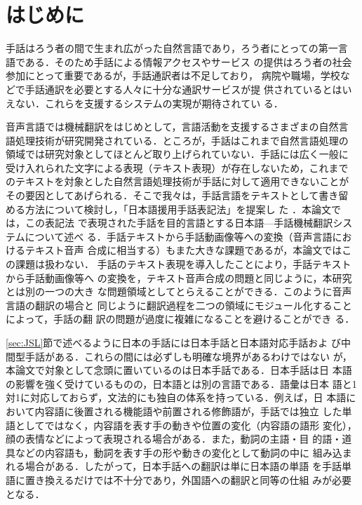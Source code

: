 \documentclass[japanese]{jnlp_1.4}
\begin{document}
\maketitle



\section{はじめに}

手話はろう者の間で生まれ広がった自然言語であり，ろう者にとっての第一言
語である\cite{Yonekawa2002}．そのため手話による情報アクセスやサービス
の提供はろう者の社会参加にとって重要であるが，手話通訳者は不足しており，
病院や職場，学校などで手話通訳を必要とする人々に十分な通訳サービスが提
供されているとはいえない．これらを支援するシステムの実現が期待されてい
る．

音声言語では機械翻訳をはじめとして，言語活動を支援するさまざまの自然言
語処理技術が研究開発されている．ところが，手話はこれまで自然言語処理の
領域では研究対象としてほとんど取り上げられていない．手話には広く一般に
受け入れられた文字による表現（テキスト表現）が存在しないため，これまで
のテキストを対象とした自然言語処理技術が手話に対して適用できないことが
その要因としてあげられる．そこで我々は，手話言語をテキストとして書き留
める方法について検討し，「日本語援用手話表記法」を提案し
た\cite{Matsumoto2006,Matsumoto2005c,Ikeda2006,Matsumoto2004a,Matsumoto2004b,Matsumoto2005a,Matsumoto2005b}
．本論文では，この表記法
で表現された手話を目的言語とする日本語—手話機械翻訳システムについて述べ
る．手話テキストから手話動画像等への変換（音声言語におけるテキスト音声
合成に相当する）もまた大きな課題であるが，本論文ではこの課題は扱わない．
手話のテキスト表現を導入したことにより，手話テキストから手話動画像等へ
の変換を，テキスト音声合成の問題と同じように，本研究とは別の一つの大き
な問題領域としてとらえることができる．このように音声言語の翻訳の場合と
同じように翻訳過程を二つの領域にモジュール化することによって，手話の翻
訳の問題が過度に複雑になることを避けることができ
る．
\nocite{Matsumoto2005a,Matsumoto2005b,Matsumoto2004a,Matsumoto2004b}

\ref{sec:JSL}節で述べるように日本の手話には日本手話と日本語対応手話およ
び中間型手話がある．これらの間には必ずしも明確な境界があるわけではない
が，本論文で対象として念頭に置いているのは日本手話である．日本手話は日
本語の影響を強く受けているものの，日本語とは別の言語である．語彙は日本
語と1対1に対応しておらず，文法的にも独自の体系を持っている．例えば，日
本語において内容語に後置される機能語や前置される修飾語が，手話では独立
した単語としてではなく，内容語を表す手の動きや位置の変化（内容語の語形
変化），顔の表情などによって表現される場合がある．また，動詞の主語・目
的語・道具などの内容語も，動詞を表す手の形や動きの変化として動詞の中に
組み込まれる場合がある．したがって，日本手話への翻訳は単に日本語の単語
を手話単語に置き換えるだけでは不十分であり，外国語への翻訳と同等の仕組
みが必要となる．
\end{document}
